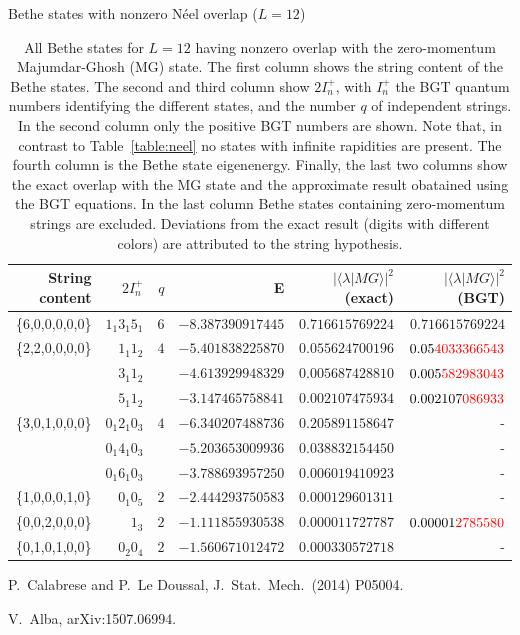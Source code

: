 \documentclass[11pt]{iopart}
\begin{document}
\begin{table}[h]
\scriptsize
\centering
Bethe states with nonzero N\'eel overlap ($L=12$)\\[1ex]
\begin{tabular}{rrrrrr}
\toprule
String content & $2I^+_n$ & $q$ & E & $|\langle\lambda|MG\rangle|^2$ (exact) & $|\langle\lambda|MG\rangle|^2$ (BGT) \\[0.3em]
\toprule
\{6,0,0,0,0,0\} &$1_1 3_1 5_1$ & $6$ & $-8.387390917445$ & $0.716615769224$ & $0.716615769224$\\
\midrule
\{2,2,0,0,0,0\} &$1_1 1_2$ & $4$ & $-5.401838225870$ & $0.055624700196$ & $0.05{\color{red}4033366543}$\\  
&$3_1 1_2 $ & & $-4.613929948329$ & $0.005687428810$ & $0.005{\color{red}582983043}$\\
&$5_1 1_2 $ &  & $-3.147465758841$ & $0.002107475934$ & $0.002107{\color{red}086933}$\\
\midrule
\{3,0,1,0,0,0\} &$0_1 2_1 0_3$ & $4$ & $-6.340207488736$ & $0.205891158647$ & -\\
  &$0_1 4_1 0_3$ & & $-5.203653009936$ & $0.038832154450$ & - \\
  &$0_1 6_1 0_3$ & & $-3.788693957250$ & $0.006019410923$ & - \\
\midrule
\{1,0,0,0,1,0\} &$0_1 0_5$ & $2$ & $-2.444293750583$ & $0.000129601311$ & - \\
\midrule
\{0,0,2,0,0,0\} &$1_3$ & $2$ & $-1.111855930538$ & $0.000011727787$ & $0.00001{\color{red}2785580}$\\
\midrule
\{0,1,0,1,0,0\} &$0_2 0_4$ & $2$ &  $-1.560671012472$ & $0.000330572718$ & - \\
\bottomrule
\end{tabular}
\caption{All Bethe states for $L=12$ having nonzero overlap with the zero-momentum Majumdar-Ghosh (MG) 
 state. The first column shows the string content of the Bethe states. The second and third column show 
 $2I_n^+$, with $I_n^+$ the BGT quantum numbers identifying the different states, and the number $q$ 
 of independent strings. In the second column only the positive BGT numbers are shown. Note that, in 
 contrast to Table~\ref{table:neel} no states with infinite rapidities are present. The fourth column 
 is the Bethe state eigenenergy. Finally, the last two columns show the exact overlap with the MG state 
 and the approximate result obatained using the BGT equations. In the last column Bethe states containing 
 zero-momentum strings are excluded. Deviations from the exact result (digits with different colors) 
 are attributed to the string hypothesis. 
}
\label{table:mg}
\end{table}




\begin{thebibliography}{99}

P.~Calabrese and P.~Le Doussal, J.\ Stat.\ Mech.\ (2014) P05004. 

V.~Alba, arXiv:1507.06994.

\end{thebibliography}
\end{document}
